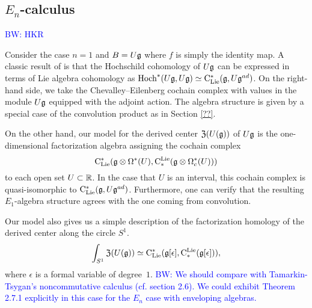 \documentclass[11pt]{amsart}
\numberwithin{equation}{section}
\def\brian{\textcolor{blue}{BW: }\textcolor{blue}}
\begin{document}
\subsection{$E_n$-calculus}
\label{sec: TT}

\brian{HKR}

Consider the case $n=1$ and $B = U \mathfrak g$ where $f$ is simply the identity map. 
A classic result of \cite{HochSerre} is that the Hochschild cohomology of $U \mathfrak g$ can be expressed in terms of Lie algebra cohomology as ${\rm Hoch}^*(U\mathfrak g,U\mathfrak g) \simeq {\rm C}_{\rm Lie}^*(\mathfrak g, U\mathfrak g^{ad})$. 
On the right-hand side, we take the Chevalley--Eilenberg cochain complex with values in the module $U \mathfrak g$ equipped with the adjoint action.
The algebra structure is given by a special case of the convolution product as in Section \ref{??}. 

On the other hand, our model for the derived center ${\frak Z}(U(\mathfrak g))$ of $U \mathfrak g$ is the one-dimensional factorization algebra assigning the cochain complex
\[
{\rm C}_{\rm Lie}^*(\mathfrak g \otimes \Omega^*(U), {\rm C}^{\rm Lie}_*( \mathfrak g \otimes \Omega^*_c(U)))
\]
to each open set $U \subset \mathbb R$.
In the case that $U$ is an interval, this cochain complex is quasi-isomorphic to ${\rm C}_{\rm Lie}^* (\mathfrak g , U\mathfrak g^{ad})$.
Furthermore, one can verify that the resulting $E_1$-algebra structure agrees with the one coming from convolution. 

Our model also gives us a simple description of the factorization homology of the derived center along the circle $S^1$.
\[
\int_{S^1} {\frak Z}(U(\mathfrak g)) \simeq {\rm C}_{\rm Lie}^*(\mathfrak g[\epsilon], {\rm C}^{\rm Lie}_*( \mathfrak g[\epsilon])),
\]
where $\epsilon$ is a formal variable of degree~$1$. 
\brian{We should compare with Tamarkin-Tsygan's noncommutative calculus (cf. section 2.6).
We could exhibit Theorem 2.7.1 explicitly in this case for the $E_n$ case with enveloping algebras.}

  


%  
\end{document}
